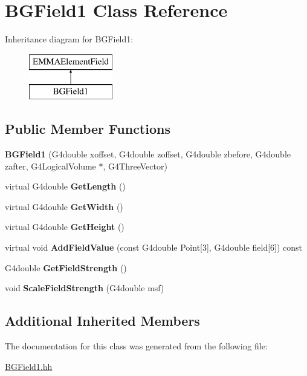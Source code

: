 \hypertarget{classBGField1}{\section{B\-G\-Field1 Class Reference}
\label{classBGField1}
}
Inheritance diagram for B\-G\-Field1\-:\begin{figure}[H]
\begin{center}
\leavevmode
\includegraphics[height=2.000000cm]{classBGField1}
\end{center}
\end{figure}
\subsection*{Public Member Functions}
\begin{DoxyCompactItemize}
\item 
\hypertarget{classBGField1_a1bc9224e371e4e289fb1104303a5e336}{{\bfseries B\-G\-Field1} (G4double xoffset, G4double zoffset, G4double zbefore, G4double zafter, G4\-Logical\-Volume $\ast$, G4\-Three\-Vector)}\label{classBGField1_a1bc9224e371e4e289fb1104303a5e336}

\item 
\hypertarget{classBGField1_a11ba0cbb1190e5f2340aa7907f7d66f9}{virtual G4double {\bfseries Get\-Length} ()}\label{classBGField1_a11ba0cbb1190e5f2340aa7907f7d66f9}

\item 
\hypertarget{classBGField1_a44eca4d023aac7e4bf9dd959760afa28}{virtual G4double {\bfseries Get\-Width} ()}\label{classBGField1_a44eca4d023aac7e4bf9dd959760afa28}

\item 
\hypertarget{classBGField1_af1b93a1566b1a53a00eb1d3ccc77815a}{virtual G4double {\bfseries Get\-Height} ()}\label{classBGField1_af1b93a1566b1a53a00eb1d3ccc77815a}

\item 
\hypertarget{classBGField1_aa6119f980c4bb2eb52067c1e66ffbae4}{virtual void {\bfseries Add\-Field\-Value} (const G4double Point\mbox{[}3\mbox{]}, G4double field\mbox{[}6\mbox{]}) const }\label{classBGField1_aa6119f980c4bb2eb52067c1e66ffbae4}

\item 
\hypertarget{classBGField1_a105ef833b5e57d8624536ba7fcf4e382}{G4double {\bfseries Get\-Field\-Strength} ()}\label{classBGField1_a105ef833b5e57d8624536ba7fcf4e382}

\item 
\hypertarget{classBGField1_ab0123f55a83d4a8a4c17b401478759a0}{void {\bfseries Scale\-Field\-Strength} (G4double msf)}\label{classBGField1_ab0123f55a83d4a8a4c17b401478759a0}

\end{DoxyCompactItemize}
\subsection*{Additional Inherited Members}


The documentation for this class was generated from the following file\-:\begin{DoxyCompactItemize}
\item 
\hyperlink{BGField1_8hh}{B\-G\-Field1.\-hh}\end{DoxyCompactItemize}
